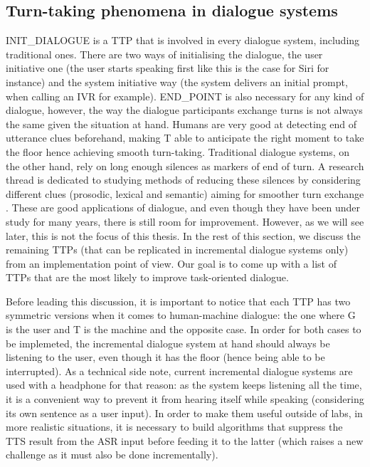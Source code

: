      \subsection{Turn-taking phenomena in dialogue systems}
		
          INIT\_DIALOGUE is a TTP that is involved in every dialogue system, including traditional ones. There are two ways of initialising the dialogue, the user initiative one (the user starts speaking first like this is the case for Siri for instance) and the system initiative way (the system delivers an initial prompt, when calling an IVR for example). END\_POINT is also necessary for any kind of dialogue, however, the way the dialogue participants exchange turns is not always the same given the situation at hand. Humans are very good at detecting end of utterance clues beforehand, making T able to anticipate the right moment to take the floor hence achieving smooth turn-taking. Traditional dialogue systems, on the other hand, rely on long enough silences as markers of end of turn. A research thread is dedicated to studying methods of reducing these silences by considering different clues (prosodic, lexical and semantic) aiming for smoother turn exchange \cite{Raux2008}. These are good applications of dialogue, and even though they have been under study for many years, there is still room for improvement. However, as we will see later, this is not the focus of this thesis. In the rest of this section, we discuss the remaining TTPs (that can be replicated in incremental dialogue systems only) from an implementation point of view. Our goal is to come up with a list of TTPs that are the most likely to improve task-oriented dialogue.

          Before leading this discussion, it is important to notice that each TTP has two symmetric versions when it comes to human-machine dialogue: the one where G is the user and T is the machine and the opposite case. In order for both cases to be implemeted, the incremental dialogue system at hand should always be listening to the user, even though it has the floor (hence being able to be interrupted). As a technical side note, current incremental dialogue systems are used with a headphone for that reason: as the system keeps listening all the time, it is a convenient way to prevent it from hearing itself while speaking (considering its own sentence as a user input). In order to make them useful outside of labs, in more realistic situations, it is necessary to build algorithms that suppress the TTS result from the ASR input before feeding it to the latter (which raises a new challenge as it must also be done incrementally).
